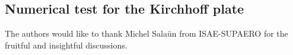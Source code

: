 \documentclass{ifacconf}
\begin{document}
 
\subsection{Numerical test for the Kirchhoff plate}

\begin{ack}
The authors would like to thank Michel Sala\"un from ISAE-SUPAERO for the fruitful and insightful discussions.
\end{ack}

                                                   







\appendix

      
\end{document}
